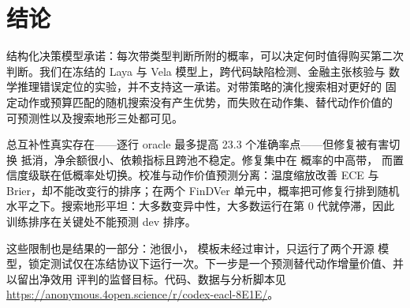 \section{结论}

结构化决策模型承诺：每次带类型判断所附的概率，可以决定何时值得购买第二次
判断。我们在冻结的 Laya 与 Vela 模型上，跨代码缺陷检测、金融主张核验与
数学推理错误定位的实验，并不支持这一承诺。对带策略的演化搜索相对更好的
固定动作或预算匹配的随机搜索没有产生优势，而失败在动作集、替代动作价值的
可预测性以及搜索地形三处都可见。

总互补性真实存在——逐行 oracle 最多提高 23.3 个准确率点——但修复被有害切换
抵消，净余额很小、依赖指标且跨池不稳定。修复集中在 \noul{} 概率的中高带，
而置信度级联在低概率处切换。校准与动作价值预测分离：温度缩放改善 ECE 与
Brier，却不能改变行的排序；在两个 FinDVer 单元中，概率把可修复行排到随机
水平之下。搜索地形平坦：大多数变异中性，大多数运行在第 0 代就停滞，因此
训练排序在关键处不能预测 dev 排序。

这些限制也是结果的一部分：池很小，\noul{} 模板未经过审计，只运行了两个开源
模型，锁定测试仅在冻结协议下运行一次。下一步是一个预测替代动作增量价值、并以留出净效用
评判的监督目标。代码、数据与分析脚本见
\url{https://anonymous.4open.science/r/codex-eacl-8E1E/}。
